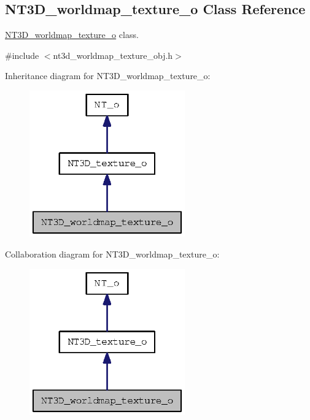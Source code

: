 \subsection{NT3D\_\-worldmap\_\-texture\_\-o Class Reference}
\label{class_n_t3_d__worldmap__texture__o}


\hyperlink{class_n_t3_d__worldmap__texture__o}{NT3D\_\-worldmap\_\-texture\_\-o} class.  




{\ttfamily \#include $<$nt3d\_\-worldmap\_\-texture\_\-obj.h$>$}



Inheritance diagram for NT3D\_\-worldmap\_\-texture\_\-o:
\nopagebreak
\begin{figure}[H]
\begin{center}
\leavevmode
\includegraphics[width=190pt]{class_n_t3_d__worldmap__texture__o__inherit__graph}
\end{center}
\end{figure}


Collaboration diagram for NT3D\_\-worldmap\_\-texture\_\-o:
\nopagebreak
\begin{figure}[H]
\begin{center}
\leavevmode
\includegraphics[width=190pt]{class_n_t3_d__worldmap__texture__o__coll__graph}
\end{center}
\end{figure}
